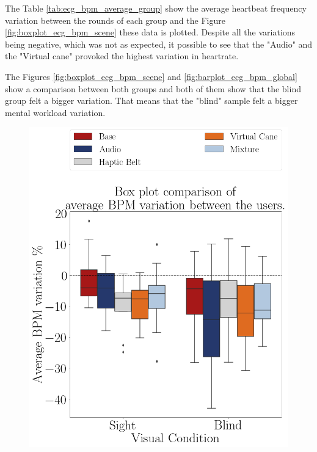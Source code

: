The Table \ref{tab:ecg_bpm_average_group} show the average heartbeat frequency variation between the rounds of each group and the Figure \ref{fig:boxplot_ecg_bpm_scene} these data is plotted. Despite all the variations being negative, which was not as expected, it possible to see that the "Audio" and the "Virtual cane" provoked the highest variation in heartrate.



The Figures \ref{fig:boxplot_ecg_bpm_scene} and \ref{fig:barplot_ecg_bpm_global} show a comparison between both groups and both of them show that the blind group felt a bigger variation. That means that the "blind" sample felt a bigger mental workload variation.

\begin{figure}[!htb]
    \begin{minipage}{.45\linewidth}
        \centering
        \includegraphics[width = \linewidth]{Resultados/ECG/Figuras/png/boxplot_ecg_bpm_scene.png}

\end{minipage}
\end{figure}
